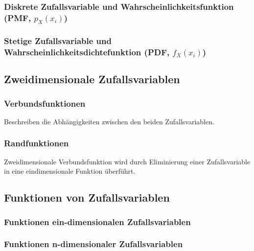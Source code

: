 \subsubsection{Diskrete Zufallsvariable und Wahrscheinlichkeitsfunktion (PMF, $p_X(x_i)$) }
\subsubsection{Stetige Zufallsvariable und Wahrscheinlichkeitsdichtefunktion (PDF, $f_X(x_i)$) }
\vspace{0.25cm}

\subsection{Zweidimensionale Zufallsvariablen }

\subsubsection{Verbundsfunktionen }
\vspace{-0.2cm}
\hspace*{0.2cm} Beschreiben die Abhängigkeiten zwischen den beiden Zufallsvariablen.
\vspace{-0.2cm}
\subsubsection{Randfunktionen }
\vspace{-0.2cm}
\hspace*{0.2cm} Zweidimensionale Verbundsfunktion wird durch Eliminierung einer Zufallsvariable in eine eindimensionale Funktion überführt.
\vspace{-0.5cm}

\subsection{Funktionen von Zufallsvariablen }
\subsubsection{Funktionen ein-dimensionalen Zufallsvariablen }
\subsubsection{Funktionen n-dimensionaler Zufallsvariablen }
\vspace{0.25cm}

